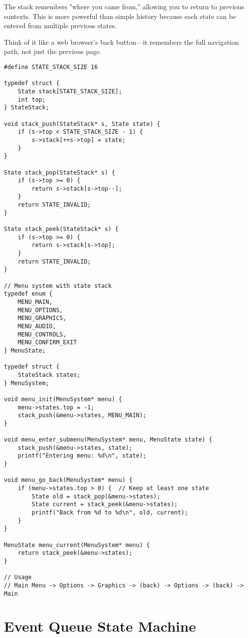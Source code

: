 The stack remembers "where you came from," allowing you to return to previous contexts. This is more powerful than simple history because each state can be entered from multiple previous states.

Think of it like a web browser's back button—it remembers the full navigation path, not just the previous page.

\begin{lstlisting}
#define STATE_STACK_SIZE 16

typedef struct {
    State stack[STATE_STACK_SIZE];
    int top;
} StateStack;

void stack_push(StateStack* s, State state) {
    if (s->top < STATE_STACK_SIZE - 1) {
        s->stack[++s->top] = state;
    }
}

State stack_pop(StateStack* s) {
    if (s->top >= 0) {
        return s->stack[s->top--];
    }
    return STATE_INVALID;
}

State stack_peek(StateStack* s) {
    if (s->top >= 0) {
        return s->stack[s->top];
    }
    return STATE_INVALID;
}

// Menu system with state stack
typedef enum {
    MENU_MAIN,
    MENU_OPTIONS,
    MENU_GRAPHICS,
    MENU_AUDIO,
    MENU_CONTROLS,
    MENU_CONFIRM_EXIT
} MenuState;

typedef struct {
    StateStack states;
} MenuSystem;

void menu_init(MenuSystem* menu) {
    menu->states.top = -1;
    stack_push(&menu->states, MENU_MAIN);
}

void menu_enter_submenu(MenuSystem* menu, MenuState state) {
    stack_push(&menu->states, state);
    printf("Entering menu: %d\n", state);
}

void menu_go_back(MenuSystem* menu) {
    if (menu->states.top > 0) {  // Keep at least one state
        State old = stack_pop(&menu->states);
        State current = stack_peek(&menu->states);
        printf("Back from %d to %d\n", old, current);
    }
}

MenuState menu_current(MenuSystem* menu) {
    return stack_peek(&menu->states);
}

// Usage
// Main Menu -> Options -> Graphics -> (back) -> Options -> (back) -> Main
\end{lstlisting}

\section{Event Queue State Machine}

